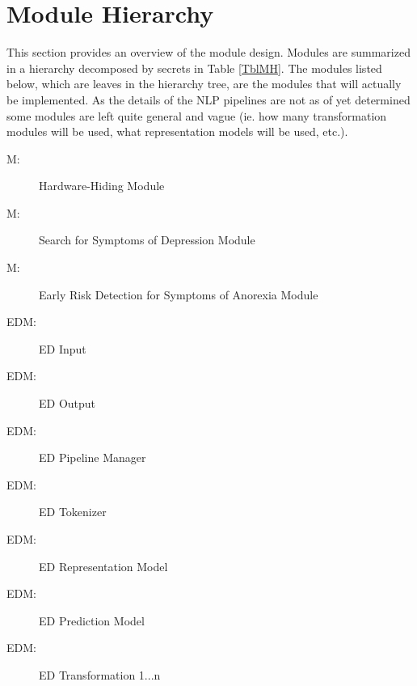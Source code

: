 \documentclass[12pt, titlepage]{article}
\newcounter{mnum}
\newcommand{\mthemnum}{M\themnum}
\newcounter{edmnum}
\newcommand{\edmthemnum}{EDM\theedmnum}
\begin{document}
\section{Module Hierarchy} \label{SecMH}

This section provides an overview of the module design. Modules are summarized
in a hierarchy decomposed by secrets in Table \ref{TblMH}. The modules listed
below, which are leaves in the hierarchy tree, are the modules that will
actually be implemented. As the details of the NLP pipelines are not as of yet determined some modules are left quite general and vague (ie. how many transformation modules will be used, what representation models will be used, etc.).
\begin{description}
\item [ \mthemnum \label{mHH}:] Hardware-Hiding Module
\item [ \mthemnum \label{m2}:] Search for Symptoms of Depression Module
\item [ \mthemnum \label{m3}:] Early Risk Detection for Symptoms of Anorexia Module
\item [ \edmthemnum \label{edmI}:] ED Input
\item [ \edmthemnum \label{edmO}:] ED Output
\item [ \edmthemnum \label{edmPipeline}:] ED Pipeline Manager
\item [ \edmthemnum \label{edmToken}:] ED Tokenizer
\item [ \edmthemnum \label{edmRM}:] ED Representation Model
\item [ \edmthemnum \label{edmPM}:] ED Prediction Model
\item [ \edmthemnum \label{edmTrans}:] ED Transformation 1...n
\end{description}
\end{document}
